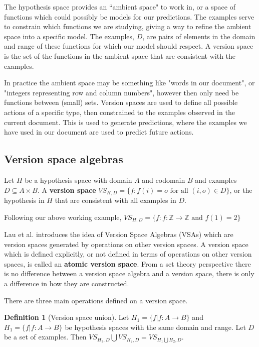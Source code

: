 \documentclass{article}
\theoremstyle{definition}
\newtheorem{definition}{Definition}[section]
\begin{document}
The hypothesis space provides an ``ambient space" to work in, or a space of functions which could possibly be models for our predictions. The examples serve to constrain which functions we are studying, giving a way to refine the ambient space into a specific model.  The examples, $D$, are pairs of elements in the domain and range of these functions for which our model should respect. A version space is the set of the functions in the ambient space that are consistent with the examples. 

In practice the ambient space may be something like "words in our document", or "integers representing row and column numbers", however then only need be functions between (small) sets. Version spaces are used to define all possible actions of a specific type, then constrained to the examples observed in the current document. This is used to generate predictions, where the examples we have used in our document are used to predict future actions.

\subsection{Version space algebras}
Let $H$ be a hypothesis space with domain $A$ and codomain $B$ and examples $D \subseteq A \times B$. A \textbf{version space} $VS_{H,D} = \{f : f(i) = o \text{ for all } (i,o) \in D\}$, or the hypothesis in $H$ that are consistent with all examples in $D$. 

Following our above working example, $VS_{H,D} = \{f : f: \mathbb{Z} \rightarrow \mathbb{Z} \text{ and } f(1) = 2\}$

Lau et al.\cite{short} introduces the idea of Version Space Algebras (VSAs) which are version spaces generated by operations on other version spaces. A version space which is defined explicitly, or not defined in terms of operations on other version spaces, is called an \textbf{atomic version space}. From a set theory perspective there is no difference between a version space algebra and a version space, there is only a difference in how they are constructed. 

There are three main operations defined on a version space. 
\begin{definition}[Version space union]
    Let $H_1 = \{f | f: A \rightarrow B\}$ and $H_1 = \{f | f: A \rightarrow B\}$ be hypothesis spaces with the same domain and range. Let $D$ be a set of examples. Then $VS_{H_1, D} \bigcup VS_{H_2, D} = VS_{H_1\bigcup H_2, D}$. 
\end{definition}
\end{document}
